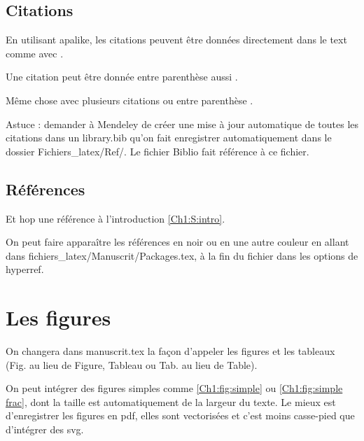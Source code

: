 \subsection{Citations}

En utilisant apalike, les citations peuvent être données directement dans le text comme avec \cite{Reiersol1950}.

Une citation peut être donnée entre parenthèse aussi \citep{Reiersol1950}.

Même chose avec plusieurs citations \cite{Reiersol1950,Walter1994b} ou entre parenthèse \citep{Reiersol1950,Walter1994b}.

Astuce : demander à Mendeley de créer une mise à jour automatique de toutes les citations dans un library.bib qu'on fait enregistrer automatiquement dans le dossier Fichiers\_latex/Ref/. Le fichier Biblio fait référence à ce fichier.

\subsection{Références}

Et hop une référence à l'introduction \ref{Ch1:S:intro}.

\begin{sloppypar}
	On peut faire apparaître les références en noir ou en une autre couleur en allant dans fichiers\_latex/Manuscrit/Packages.tex, à la fin du fichier dans les options de hyperref.
\end{sloppypar}

\section{Les figures}
\label{Ch1:S:figures}

On changera dans manuscrit.tex la façon d'appeler les figures et les tableaux (Fig. au lieu de Figure, Tableau ou Tab. au lieu de Table).

On peut intégrer des figures simples comme \ref{Ch1:fig:simple} ou \ref{Ch1:fig:simple frac}, dont la taille est automatiquement de la largeur du texte. Le mieux est d'enregistrer les figures en pdf, elles sont vectorisées et c'est moins casse-pied que d'intégrer des svg.

